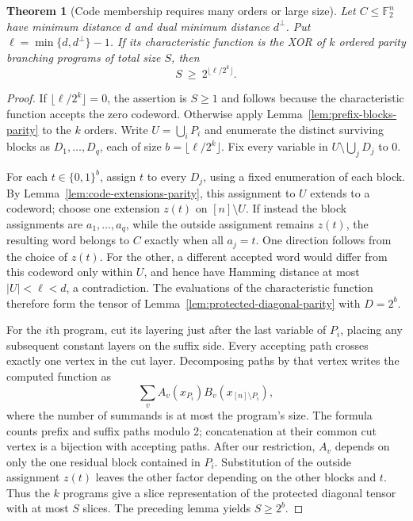 \documentclass[11pt]{article}
\newtheorem{theorem}{Theorem}[section]
\theoremstyle{definition}
\theoremstyle{remark}
\begin{document}
\begin{theorem}[Code membership requires many orders or large size]
\label{thm:code-orders-parity}
Let $C\le\mathbb F_2^n$ have minimum distance $d$ and dual minimum
distance $d^\perp$.  Put $\ell=\min\{d,d^\perp\}-1$.
If its characteristic function is the XOR of $k$ ordered parity
branching programs of total size $S$, then
\[
             S\ \ge\ 2^{\lfloor\ell/2^k\rfloor}.
\]
\end{theorem}
\begin{proof}
If $\lfloor\ell/2^k\rfloor=0$, the assertion is $S\ge1$ and follows
because the characteristic function accepts the zero codeword.
Otherwise apply Lemma~\ref{lem:prefix-blocks-parity} to the $k$ orders.
Write $U=\bigcup_iP_i$ and enumerate the distinct surviving blocks as
$D_1,\ldots,D_q$, each of size $b=\lfloor\ell/2^k\rfloor$.
Fix every variable in $U\setminus\bigcup_jD_j$ to 0.

For each $t\in\{0,1\}^{b}$, assign $t$ to every $D_j$, using a fixed
enumeration of each block.  By Lemma~\ref{lem:code-extensions-parity},
this assignment to $U$ extends to a codeword; choose one extension
$z(t)$ on $[n]\setminus U$.
If instead the block assignments are $a_1,\ldots,a_q$, while the
outside assignment remains $z(t)$, the resulting word belongs to $C$
exactly when all $a_j=t$.
One direction follows from the choice of $z(t)$.
For the other, a different accepted word would differ from this
codeword only within $U$, and hence have Hamming distance at most
$|U|<\ell<d$, a contradiction.
The evaluations of the characteristic function therefore form the
tensor of Lemma~\ref{lem:protected-diagonal-parity} with $D=2^b$.

For the $i$th program, cut its layering just after the last variable
of $P_i$, placing any subsequent constant layers on the suffix side.
Every accepting path crosses exactly one vertex in the cut layer.
Decomposing paths by that vertex writes the
computed function as
\[
                  \sum_{v} A_v(x_{P_i})B_v(x_{[n]\setminus P_i}),
\]
where the number of summands is at most the program's size.
The formula counts prefix and suffix paths modulo 2; concatenation
at their common cut vertex is a bijection with accepting paths.
After our restriction, $A_v$ depends on only the one residual block
contained in $P_i$.  Substitution of the outside assignment $z(t)$
leaves the other factor depending on the other blocks and $t$.
Thus the $k$ programs give a slice representation of the protected
diagonal tensor with at most $S$ slices.  The preceding lemma yields
$S\ge2^b$.
\end{proof}
\end{document}
